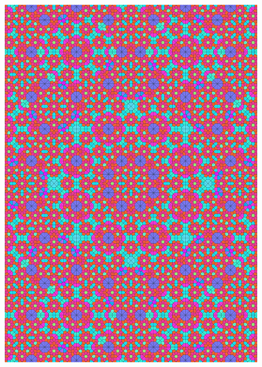 \documentclass[text.tex]{subfiles}
\begin{document}
\begin{figure}[h!]
\centering
\includegraphics[width=1\textwidth]{img/results/circle8/quasi_circle_120710_(0_1alpha_2).pdf}
\end{figure}
\end{document}

